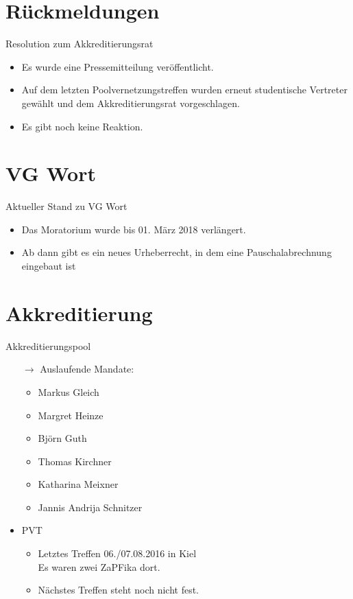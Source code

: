 \documentclass[compress, aspectratio=169]{beamer}
\begin{document}
\section{Rückmeldungen}

\begin{frame}{Resolution zum Akkreditierungsrat}
  \begin{itemize}
  \item Es wurde eine Pressemitteilung veröffentlicht.
  \item Auf dem letzten Poolvernetzungstreffen wurden erneut studentische Vertreter gewählt und dem Akkreditierungsrat vorgeschlagen.
  \item Es gibt noch keine Reaktion.
  \end{itemize}
\end{frame}

\section{VG Wort}

\begin{frame}{Aktueller Stand zu VG Wort}
  \begin{itemize}
    \item Das Moratorium wurde bis 01. März 2018 verlängert.
    \item Ab dann gibt es ein neues Urheberrecht, in dem eine Pauschalabrechnung eingebaut ist
  \end{itemize}
\end{frame}

\section{Akkreditierung}

\begin{frame}{Akkreditierungspool}
  \begin{itemize}
    \item[$\rightarrow$] Auslaufende Mandate:
      \begin{itemize}
      \item Markus Gleich
      \item Margret Heinze
      \item Björn Guth
      \item Thomas Kirchner
      \item Katharina Meixner
      \item Jannis Andrija Schnitzer
      \end{itemize}
    \item PVT
      \begin{itemize}
      \item Letztes Treffen 06./07.08.2016 in Kiel\\
        Es waren zwei ZaPFika dort.
      \item Nächstes Treffen steht noch nicht fest.
      \end{itemize}
    \end{itemize}
\end{frame}
\end{document}
